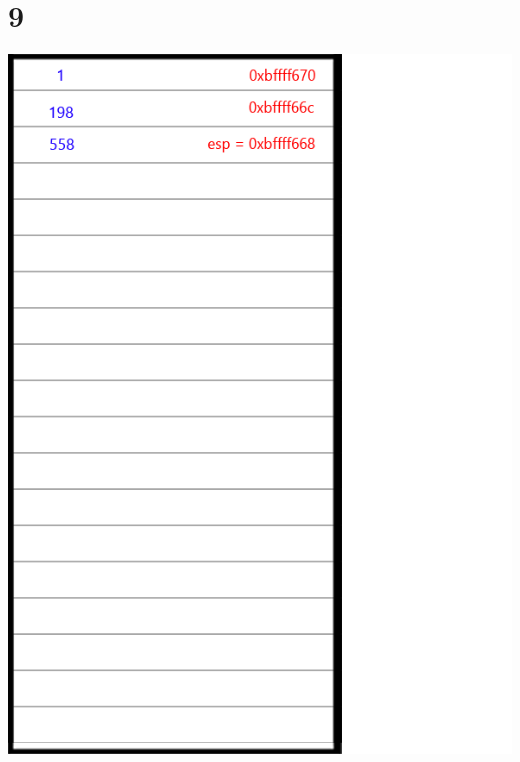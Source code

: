 \documentclass{article}
\begin{document}
\section*{9}
\begin{minipage}{5cm}
\includegraphics[scale=0.3]{s3.png}
\end{minipage}
\end{document}
